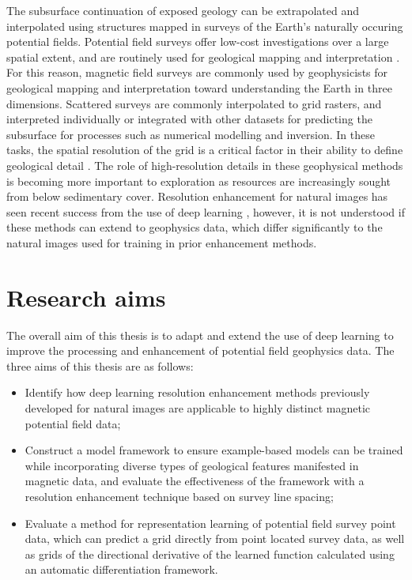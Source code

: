 % 
% 

The subsurface continuation of exposed geology can be extrapolated and interpolated using structures mapped in surveys of the Earth's naturally occuring potential fields.
Potential field surveys offer low-cost investigations over a large spatial extent, and are routinely used for geological mapping and interpretation \parencite{nabighian75thAnniversaryHistorical2005}.
For this reason, magnetic field surveys are commonly used by geophysicists for geological mapping and interpretation toward understanding the Earth in three dimensions.
Scattered surveys are commonly interpolated to grid rasters, and interpreted individually or integrated with other datasets for predicting the subsurface for processes such as numerical modelling and inversion.
In these tasks, the spatial resolution of the grid is a critical factor in their ability to define geological detail \parencite{islesGeologicalInterpretationAeromagnetic2013}.
The role of high-resolution details in these geophysical methods is becoming more important to exploration as resources are increasingly sought from below sedimentary cover.
Resolution enhancement for natural images has seen recent success from the use of deep learning \parencite{moserHitchhikerGuideSuperResolution2023}, however, it is not understood if these methods can extend to geophysics data, which differ significantly to the natural images used for training in prior enhancement methods.

\section{Research aims}
The overall aim of this thesis is to adapt and extend the use of deep learning to improve the processing and enhancement of potential field geophysics data. The three aims of this thesis are as follows:

\begin{itemize}
    \item{} Identify how deep learning resolution enhancement methods previously developed for natural images are applicable to highly distinct magnetic potential field data;

    \item{} Construct a model framework to ensure example-based models can be trained while incorporating diverse types of geological features manifested in magnetic data, and evaluate the effectiveness of the framework with a resolution enhancement technique based on survey line spacing;

    \item{} Evaluate a method for representation learning of potential field survey point data, which can predict a grid directly from point located survey data, as well as grids of the directional derivative of the learned function calculated using an automatic differentiation framework.
\end{itemize}

